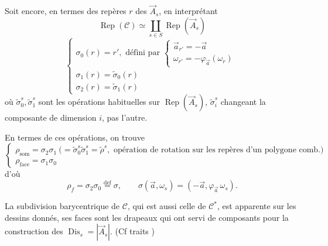 \documentclass[11pt,a4paper]{article}
\begin{document}
Soit encore, en termes des repères $r$ des $\vec{A}_s$, en interprétant
\[
\operatorname{Rep}(\mathcal{C}) \simeq \coprod_{s \in S} \operatorname{Rep}(\vec{A}_s)
\]
\[
\left\lbrace
\begin{array}{l}
\sigma_0(r) = r', \text{ défini par } \left\lbrace \begin{array}{l} \vec{a}_{r'} = -\vec{a} \\ \omega_{r'} = -\varphi_{\vec{a}}(\omega_r) \end{array} \right. \\
\sigma_1(r) = \widetilde{\sigma}_0(r) \\
\sigma_2(r) = \widetilde{\sigma}_1(r)
\end{array}
\right.
\]
où $\widetilde{\sigma}_0^{s}, \widetilde{\sigma}_1^{s}$ sont les opérations habituelles sur $\operatorname{Rep}(\vec{A}_s)$, $\widetilde{\sigma}_i^{s}$ changeant la composante  de dimension $i$, pas l'autre.

En termes de ces opérations, on trouve
\[
\left\lbrace
\begin{array}{l}
\rho_{\mathrm{som}} = \sigma_2\sigma_1 \ \bigl(= \widetilde{\sigma}_0^{s}\widetilde{\sigma}_1^{s} = \widetilde{\rho}^{s}, \text{ opération de rotation sur les repères d'un polygone comb.}\bigr) \\
\rho_{\mathrm{face}} = \sigma_1\sigma_0
\end{array}
\right.
\]
d'où
\[
\rho_f = \sigma_2\sigma_0 \overset{\mathrm{def}}{=} \sigma, \qquad \sigma(\vec{a}, \omega_s) = (-\vec{a}, \varphi_{\vec{a}}\,\omega_s).
\]

La subdivision barycentrique de $\mathcal{C}$, qui est aussi celle de $\mathcal{C}^{*}$, est apparente sur les dessins donnés, ses faces sont les drapeaux qui ont servi de composants pour la construction des $\operatorname{Dis}_s = |\vec{A}_s|$. (Cf traits \ill{} \ill{} \ill{})
\end{document}
